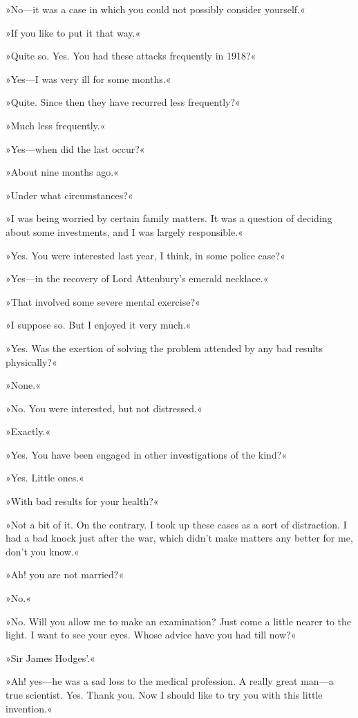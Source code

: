 »No—it was a case in which you could not possibly consider yourself.«

»If you like to put it that way.«

»Quite so. Yes. You had these attacks frequently in 1918?«

»Yes—I was very ill for some months.«

»Quite. Since then they have recurred less frequently?«

»Much less frequently.«

»Yes—when did the last occur?«

»About nine months ago.«

»Under what circumstances?«

»I was being worried by certain family matters. It was a question of deciding about some investments, and I was largely responsible.«

»Yes. You were interested last year, I think, in some police case?«

»Yes—in the recovery of Lord Attenbury's emerald necklace.«

»That involved some severe mental exercise?«

»I suppose so. But I enjoyed it very much.«

»Yes. Was the exertion of solving the problem attended by any bad results physically?«

»None.«

»No. You were interested, but not distressed.«

»Exactly.«

»Yes. You have been engaged in other investigations of the kind?«

»Yes. Little ones.«

»With bad results for your health?«

»Not a bit of it. On the contrary. I took up these cases as a sort of distraction. I had a bad knock just after the war, which didn't make matters any better for me, don't you know.«

»Ah! you are not married?«

»No.«

»No. Will you allow me to make an examination? Just come a little nearer to the light. I want to see your eyes. Whose advice have you had till now?«

»Sir James Hodges'.«

»Ah! yes—he was a sad loss to the medical profession. A really great man—a true scientist. Yes. Thank you. Now I should like to try you with this little invention.«

